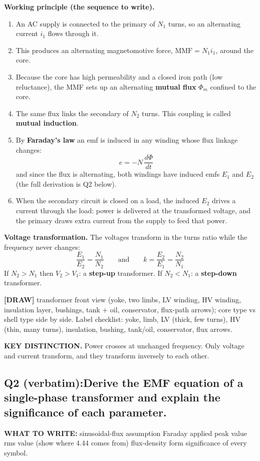 \documentclass[11pt]{article}
\newcommand{\qhead}[2]{\subsection*{\color{copper}#1\quad\color{iron}#2}}
\newcommand{\tagline}[1]{\textbf{\color{copper}#1}}
\newcommand{\keydist}[1]{\vspace{2pt}\textbf{\color{red}KEY DISTINCTION.} #1}
\newcommand{\drawline}[1]{\textbf{\color{muted}[DRAW]} #1}
\begin{document}
\textbf{Working principle (the sequence to write).}
\begin{enumerate}[label=\arabic*.]
\item An AC supply is connected to the primary of $N_1$ turns, so an alternating current $i_1$ flows through it.
\item This produces an alternating magnetomotive force, $\text{MMF} = N_1 i_1$, around the core.
\item Because the core has high permeability and a closed iron path (low reluctance), the MMF sets up an alternating \textbf{mutual flux} $\Phi_m$ confined to the core.
\item The same flux links the secondary of $N_2$ turns. This coupling is called \textbf{mutual induction}.
\item By \textbf{Faraday's law} an emf is induced in any winding whose flux linkage changes:
\[
e = -N\,\frac{d\Phi}{dt}
\]
and since the flux is alternating, both windings have induced emfs $E_1$ and $E_2$ (the full derivation is Q2 below).
\item When the secondary circuit is closed on a load, the induced $E_2$ drives a current through the load: power is delivered at the transformed voltage, and the primary draws extra current from the supply to feed that power.
\end{enumerate}

\textbf{Voltage transformation.} The voltages transform in the turns ratio while the frequency never changes:
\[
\frac{E_1}{E_2} = \frac{N_1}{N_2}
\qquad\text{and}\qquad
k = \frac{E_2}{E_1} = \frac{N_2}{N_1}
\]
If $N_2 > N_1$ then $V_2 > V_1$: a \textbf{step-up} transformer. If $N_2 < N_1$: a \textbf{step-down} transformer.

\drawline{transformer front view (yoke, two limbs, LV winding, HV winding, insulation layer, bushings, tank + oil, conservator, flux-path arrows); core type vs shell type side by side. Label checklist: yoke, limb, LV (thick, few turns), HV (thin, many turns), insulation, bushing, tank/oil, conservator, flux arrows.}

\keydist{Power crosses at unchanged frequency. Only voltage and current transform, and they transform inversely to each other.}

\qhead{Q2 (verbatim):}{Derive the EMF equation of a single-phase transformer and explain the significance of each parameter.}

\tagline{WHAT TO WRITE:} sinusoidal-flux assumption \textrightarrow{} Faraday applied \textrightarrow{} peak value \textrightarrow{} rms value (show where 4.44 comes from) \textrightarrow{} flux-density form \textrightarrow{} significance of every symbol.
\end{document}
